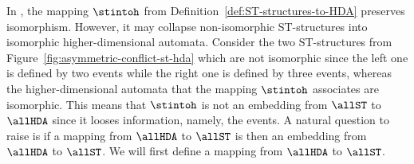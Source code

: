     In \cite[Proposition 3.39]{Johansen16STstruct}, the mapping $\stintoh$ from Definition~\ref{def:ST-structures-to-HDA} preserves isomorphism. However, it may collapse non-isomorphic ST-structures into isomorphic higher-dimensional automata. Consider the two ST-structures from Figure~\ref{fig:asymmetric-conflict-st-hda} which are not isomorphic since the left one is defined by two events while the right one is defined by three events, whereas the higher-dimensional automata that the mapping $\stintoh$ associates are isomorphic. This means that $\stintoh$ is not an embedding from $\allST$ to $\allHDA$ since it looses information, namely, the events. A natural question to raise is if a mapping from $\allHDA$ to $\allST$ is then an embedding from $\allHDA$ to $\allST$. We will first define a mapping from $\allHDA$ to $\allST$.

